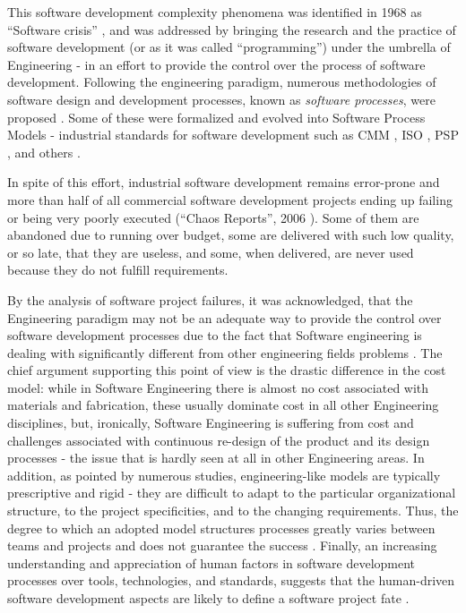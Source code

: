 This software development complexity phenomena was identified in 1968 as ``Software crisis'' 
\cite{naur_crisis_68}, and was addressed by bringing the research and the practice of software development 
(or as it was called ``programming'') under the umbrella of Engineering - in an effort to provide 
the control over the process of software development. 
Following the engineering paradigm, numerous methodologies of software design and development 
processes, known as \textit{software processes}, were proposed \cite{citeulike:10002165}.
Some of these were formalized and evolved into Software Process Models - industrial standards for 
software development such as CMM \cite{citeulike:9962021}, ISO \cite{iso-standard}, 
PSP \cite{citeulike:8347315}, and others \cite{citeulike:5043104}. 

In spite of this effort, industrial software  development remains error-prone and more than half of all 
commercial software development projects ending up failing or being very poorly executed 
(``Chaos Reports'', 2006 \cite{chaos2006}). Some of them are abandoned due to running 
over budget, some are delivered with such low quality, or so late, that they are useless, and some, 
when delivered, are never used because they do not fulfill requirements. 

By the analysis of software project failures, it was acknowledged, that the Engineering paradigm 
may not be an adequate way to provide the control over software development processes 
due to the fact that Software engineering is dealing with significantly different from other engineering 
fields problems \cite{citeulike:3729379} \cite{citeulike:5203446} \cite{citeulike:2207657}.
The chief argument supporting this point of view is the drastic difference in the cost model:
while in Software Engineering there is almost no cost associated with materials and 
fabrication, these usually dominate cost in all other Engineering disciplines, but, 
ironically, Software Engineering is suffering from cost and challenges associated with 
continuous re-design of the product and its design processes - the issue that is 
hardly seen at all in other Engineering areas. 
In addition, as pointed by numerous studies, engineering-like models are typically prescriptive and rigid -
they are difficult to adapt to the particular organizational structure, to the project specificities, and to 
the changing requirements. 
Thus, the degree to which an adopted model structures processes greatly varies between teams and 
projects and does not guarantee the success \cite{sacchi_2001}. 
Finally, an increasing understanding and appreciation of human factors in software development 
processes over tools, technologies, and standards, suggests that the human-driven software 
development aspects are likely to define a software project fate \cite{citeulike:6580825} 
\cite{citeulike:149387} \cite{1605185} \cite{citeulike:113403} \cite{citeulike:12743107}. 

